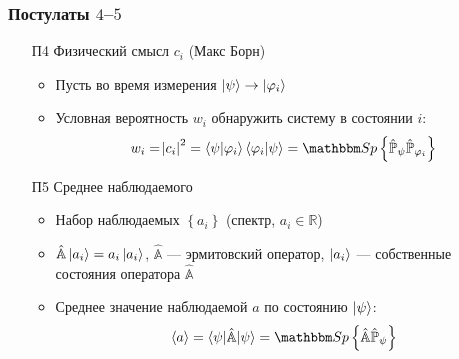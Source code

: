 \begin{frame}
    \frametitle{Постулаты $4$--$5$}
    \begin{itemize}[<+->]
    \item[П4] Физический смысл $c_i$ (Макс Борн)
        \begin{itemize}[<+->]
        \item Пусть во время измерения $\ket{\psi}\to\ket{\varphi_i}$
        \item Условная вероятность $w_i$ обнаружить систему в состоянии $i$:
        $$ w_i = \abs{ c_i }^2 = \braket {\psi|\varphi_i}
        \braket {\varphi_i|\psi} =
        \Sp {\hat{\mathbb{P}}_\psi \hat{\mathbb{P}}_{\varphi_i}}$$
        \end{itemize}
    \item[П5] Среднее наблюдаемого
        \begin{itemize}[<+->]
        \item Набор наблюдаемых $\left \{ a_i \right \}$
        (спектр, $a_i \in \mathbb{R}$)
        \item
        $\hat{\mathbb{A}} \ket{ a_i } = a_i \ket{ a_i }$,
        $\hat{\mathbb{A}}$ --- эрмитовский оператор, $\ket {a_i}$ ---
        собственные состояния оператора $\hat{\mathbb{A}}$
        \item Среднее значение наблюдаемой $a$ по состоянию $\ket{\psi}$:
        $$ \langle a \rangle = \braket {\psi | \hat{\mathbb{A}} | \psi} = 
        \Sp {\hat{\mathbb{A}} \hat{\mathbb{P}}_\psi} $$

        \end{itemize}
    \end{itemize}
\end{frame}
